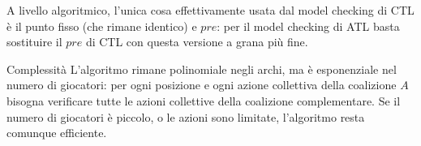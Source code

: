 A livello algoritmico, l'unica cosa effettivamente usata dal model checking di CTL è il punto fisso (che rimane identico) e \(pre\): per il model checking di ATL basta sostituire il \(pre\) di CTL con questa versione a grana più fine.

\begin{observation}{Complessità}
  L'algoritmo rimane polinomiale negli archi, ma è esponenziale nel numero di giocatori: per ogni posizione e ogni azione collettiva della coalizione \(A\) bisogna verificare tutte le azioni collettive della coalizione complementare. Se il numero di giocatori è piccolo, o le azioni sono limitate, l'algoritmo resta comunque efficiente.
\end{observation}